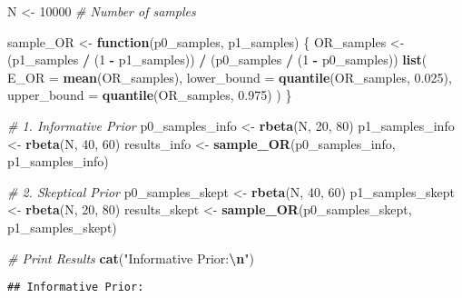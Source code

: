 \documentclass[
]{article}
\newenvironment{Shaded}{\begin{snugshade}}{\end{snugshade}}
\newcommand{\AttributeTok}[1]{\textcolor[rgb]{0.13,0.29,0.53}{#1}}
\newcommand{\CommentTok}[1]{\textcolor[rgb]{0.56,0.35,0.01}{\textit{#1}}}
\newcommand{\ControlFlowTok}[1]{\textcolor[rgb]{0.13,0.29,0.53}{\textbf{#1}}}
\newcommand{\DecValTok}[1]{\textcolor[rgb]{0.00,0.00,0.81}{#1}}
\newcommand{\FloatTok}[1]{\textcolor[rgb]{0.00,0.00,0.81}{#1}}
\newcommand{\FunctionTok}[1]{\textcolor[rgb]{0.13,0.29,0.53}{\textbf{#1}}}
\newcommand{\NormalTok}[1]{#1}
\newcommand{\OtherTok}[1]{\textcolor[rgb]{0.56,0.35,0.01}{#1}}
\newcommand{\SpecialCharTok}[1]{\textcolor[rgb]{0.81,0.36,0.00}{\textbf{#1}}}
\newcommand{\StringTok}[1]{\textcolor[rgb]{0.31,0.60,0.02}{#1}}
\begin{document}
\begin{Shaded}
\begin{Highlighting}[]
\NormalTok{N }\OtherTok{\textless{}{-}} \DecValTok{10000}  \CommentTok{\# Number of samples}

\NormalTok{sample\_OR }\OtherTok{\textless{}{-}} \ControlFlowTok{function}\NormalTok{(p0\_samples, p1\_samples) \{}
\NormalTok{  OR\_samples }\OtherTok{\textless{}{-}}\NormalTok{ (p1\_samples }\SpecialCharTok{/}\NormalTok{ (}\DecValTok{1} \SpecialCharTok{{-}}\NormalTok{ p1\_samples)) }\SpecialCharTok{/}\NormalTok{ (p0\_samples }\SpecialCharTok{/}\NormalTok{ (}\DecValTok{1} \SpecialCharTok{{-}}\NormalTok{ p0\_samples))}
  \FunctionTok{list}\NormalTok{(}
    \AttributeTok{E\_OR =} \FunctionTok{mean}\NormalTok{(OR\_samples),}
    \AttributeTok{lower\_bound =} \FunctionTok{quantile}\NormalTok{(OR\_samples, }\FloatTok{0.025}\NormalTok{),}
    \AttributeTok{upper\_bound =} \FunctionTok{quantile}\NormalTok{(OR\_samples, }\FloatTok{0.975}\NormalTok{)}
\NormalTok{  )}
\NormalTok{\}}

\CommentTok{\# 1. Informative Prior}
\NormalTok{p0\_samples\_info }\OtherTok{\textless{}{-}} \FunctionTok{rbeta}\NormalTok{(N, }\DecValTok{20}\NormalTok{, }\DecValTok{80}\NormalTok{)}
\NormalTok{p1\_samples\_info }\OtherTok{\textless{}{-}} \FunctionTok{rbeta}\NormalTok{(N, }\DecValTok{40}\NormalTok{, }\DecValTok{60}\NormalTok{)}
\NormalTok{results\_info }\OtherTok{\textless{}{-}} \FunctionTok{sample\_OR}\NormalTok{(p0\_samples\_info, p1\_samples\_info)}

\CommentTok{\# 2. Skeptical Prior}
\NormalTok{p0\_samples\_skept }\OtherTok{\textless{}{-}} \FunctionTok{rbeta}\NormalTok{(N, }\DecValTok{40}\NormalTok{, }\DecValTok{60}\NormalTok{)}
\NormalTok{p1\_samples\_skept }\OtherTok{\textless{}{-}} \FunctionTok{rbeta}\NormalTok{(N, }\DecValTok{20}\NormalTok{, }\DecValTok{80}\NormalTok{)}
\NormalTok{results\_skept }\OtherTok{\textless{}{-}} \FunctionTok{sample\_OR}\NormalTok{(p0\_samples\_skept, p1\_samples\_skept)}

\CommentTok{\# Print Results}
\FunctionTok{cat}\NormalTok{(}\StringTok{"Informative Prior:}\SpecialCharTok{\textbackslash{}n}\StringTok{"}\NormalTok{)}
\end{Highlighting}
\end{Shaded}

\begin{verbatim}
## Informative Prior:
\end{verbatim}

\begin{Shaded}
\end{Shaded}
\end{document}
